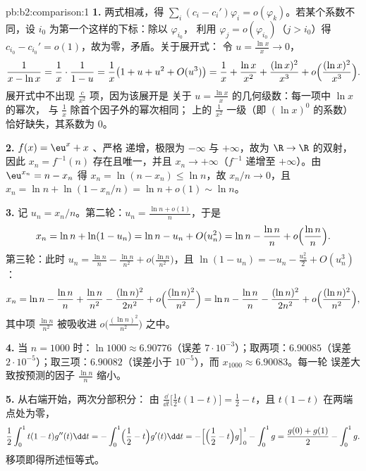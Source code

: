\begin{solution}{pb:b2:comparison:1}
\textbf{1.} 两式相减，得 $\sum_i (c_i -
c_i')\varphi_i = o(\varphi_k)$。若某个系数不同，设
$i_0$ 为第一个这样的下标：除以 $\varphi_{i_0}$，
利用 $\varphi_j = o(\varphi_{i_0})$（$j > i_0$）得 $c_{i_0} -
c_{i_0}' = o(1)$，故为零，矛盾。关于展开式：
令 $u = \frac{\ln x}x \to 0$，
\[
\frac{1}{x - \ln x} = \frac1x\cdot\frac{1}{1 - u}
= \frac1x\bigl(1 + u + u^2 + O(u^3)\bigr)
= \frac1x + \frac{\ln x}{x^2} + \frac{(\ln x)^2}{x^3} +
o\Bigl(\frac{(\ln x)^2}{x^3}\Bigr).
\]
展开式中不出现 $\frac c{x^2}$ 项，因为该展开是
关于 $u = \frac{\ln x}{x}$ 的几何级数：每一项中 $\ln x$ 的幂次，
与 $\frac1x$ 除首个因子外的幂次相同；
上的 $\frac1{x^2}$ 一级（即 $(\ln x)^0$ 的系数）
恰好缺失，其系数为 $0$。

\textbf{2.} $f(x) = \eu^x + x$ 、严格
递增，极限为 $-\infty$ 与 $+\infty$，故为
$\R \to \R$ 的双射，因此 $x_n = f^{-1}(n)$ 存在且唯一，并且
$x_n \to +\infty$（$f^{-1}$ 递增至 $+\infty$）。由
$\eu^{x_n} = n - x_n$ 得 $x_n = \ln(n - x_n) \leq \ln n$，故
$x_n/n \to 0$，且 $x_n = \ln n + \ln(1 - x_n/n) = \ln n + o(1)
\sim \ln n$。

\textbf{3.} 记 $u_n = x_n/n$。第二轮：$u_n = \frac{\ln n
+ o(1)}{n}$，于是
\[
x_n = \ln n + \ln(1 - u_n) = \ln n - u_n + O(u_n^2)
= \ln n - \frac{\ln n}{n} + o\Bigl(\frac{\ln n}n\Bigr).
\]
第三轮：此时 $u_n = \frac{\ln n}{n} - \frac{\ln n}{n^2} +
o\bigl(\frac{\ln n}{n^2}\bigr)$，且 $\ln(1 - u_n) = -u_n -
\frac{u_n^2}2 + O(u_n^3)$：
\[
x_n = \ln n - \frac{\ln n}n + \frac{\ln n}{n^2}
- \frac{(\ln n)^2}{2n^2} + o\Bigl(\frac{(\ln
n)^2}{n^2}\Bigr)
= \ln n - \frac{\ln n}{n} - \frac{(\ln n)^2}{2n^2} +
o\Bigl(\frac{(\ln n)^2}{n^2}\Bigr),
\]
其中项 $\frac{\ln n}{n^2}$ 被吸收进
$o\bigl(\frac{(\ln n)^2}{n^2}\bigr)$ 之中。

\textbf{4.} 当 $n = 1000$ 时：$\ln 1000 \approx 6.90776$（误差
$7\cdot10^{-3}$）；取两项：$6.90085$（误差
$2\cdot10^{-5}$）；取三项：$6.90082$（误差小于
$10^{-5}$），而 $x_{1000} \approx 6.90083$。每一轮
误差大致按预测的因子 $\frac{\ln n}{n}$ 缩小。

\textbf{5.} 从右端开始，两次分部积分：
由 $\frac{\dd}{\dd t}\bigl[\tfrac12t(1-t)\bigr] = \tfrac12 -
t$，且 $t(1-t)$ 在两端点处为零，
\[
\frac12\int_0^1 t(1-t)g''(t)\dd t
= -\int_0^1\Bigl(\frac12 - t\Bigr)g'(t)\dd t
= -\Bigl[\Bigl(\frac12 - t\Bigr)g\Bigr]_0^1 - \int_0^1 g
= \frac{g(0) + g(1)}2 - \int_0^1 g .
\]
移项即得所述恒等式。


\end{solution}
